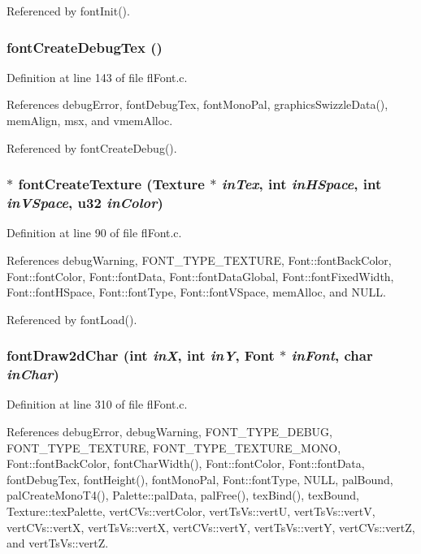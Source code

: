 Referenced by font\-Init().
\subsubsection{ font\-Create\-Debug\-Tex ()}\label{flFont_8c_86a3890982bcea3c59bdc0a52d465f98}




Definition at line 143 of file fl\-Font.c.

References debug\-Error, font\-Debug\-Tex, font\-Mono\-Pal, graphics\-Swizzle\-Data(), mem\-Align, msx, and vmem\-Alloc.

Referenced by font\-Create\-Debug().
\subsubsection{$\ast$ font\-Create\-Texture ({\bf Texture} $\ast$ {\em in\-Tex}, int {\em in\-HSpace}, int {\em in\-VSpace}, u32 {\em in\-Color})}\label{flFont_8c_3974ca441bf8e3f8af7cd80f8e4e247d}




Definition at line 90 of file fl\-Font.c.

References debug\-Warning, FONT\_\-TYPE\_\-TEXTURE, Font::font\-Back\-Color, Font::font\-Color, Font::font\-Data, Font::font\-Data\-Global, Font::font\-Fixed\-Width, Font::font\-HSpace, Font::font\-Type, Font::font\-VSpace, mem\-Alloc, and NULL.

Referenced by font\-Load().
\subsubsection{ font\-Draw2d\-Char (int {\em in\-X}, int {\em in\-Y}, {\bf Font} $\ast$ {\em in\-Font}, char {\em in\-Char})}\label{flFont_8c_bd6cbddc091774731d817cd169b35bfe}




Definition at line 310 of file fl\-Font.c.

References debug\-Error, debug\-Warning, FONT\_\-TYPE\_\-DEBUG, FONT\_\-TYPE\_\-TEXTURE, FONT\_\-TYPE\_\-TEXTURE\_\-MONO, Font::font\-Back\-Color, font\-Char\-Width(), Font::font\-Color, Font::font\-Data, font\-Debug\-Tex, font\-Height(), font\-Mono\-Pal, Font::font\-Type, NULL, pal\-Bound, pal\-Create\-Mono\-T4(), Palette::pal\-Data, pal\-Free(), tex\-Bind(), tex\-Bound, Texture::tex\-Palette, vert\-CVs::vert\-Color, vert\-Ts\-Vs::vert\-U, vert\-Ts\-Vs::vert\-V, vert\-CVs::vert\-X, vert\-Ts\-Vs::vert\-X, vert\-CVs::vert\-Y, vert\-Ts\-Vs::vert\-Y, vert\-CVs::vert\-Z, and vert\-Ts\-Vs::vert\-Z.
